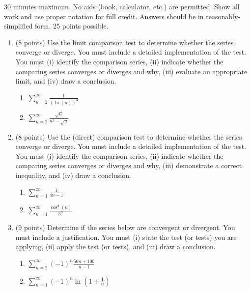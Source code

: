 \documentclass[12pt]{article}
\newcommand{\ds}{\displaystyle}
\begin{document}
30 minutes maximum.  No aids (book, calculator, etc.) are permitted.  Show all work and use proper notation for full credit.  Answers should be in reasonably-simplified form.  25 points possible.

\begin{enumerate}
\item (8 points) Use the limit comparison test to determine whether the series converge or diverge. You must include a detailed implementation of the test. You must (i) identify the comparison series, (ii) indicate whether the comparing series converges or diverges and why, (iii) evaluate an appropriate limit, and (iv) draw a conclusion.
	\begin{enumerate}
	\item $\ds \sum_{n=2}^{\infty} \frac{1}{(\ln(n))^3}$
	\vfill
	\item $\ds \sum_{n=2}^{\infty} \frac{\sqrt{n}}{n^2-\sqrt{n}}$
	\vfill
	\end{enumerate}
\newpage
\item (8 points) Use the (direct) comparison test to determine whether the series converge or diverge. You must include a detailed implementation of the test. You must (i) identify the comparison series, (ii) indicate whether the comparing series converges or diverges and why, (iii) demonstrate a correct inequality, and (iv) draw a conclusion.
	\begin{enumerate}
	\item $\ds \sum_{n=1}^{\infty} \frac{1}{4n-1}$
	\vfill
	\item $\ds \sum_{n=1}^{\infty} \frac{\cos^2(n)}{3^n}$
	\vfill
	\end{enumerate}
\newpage

\item (9 points) Determine if the series below are convergent or divergent. You must include a justification. You must (i) state the test (or tests) you are applying, (ii) apply the test (or tests), and (iii) draw a conclusion.
	\begin{enumerate}
	\item $\ds \sum_{n=2}^{\infty} (-1)^{n}\frac{50n+100}{n-1} $
	\vfill
	\item $\ds \sum_{n=1}^{\infty} (-1)^n \ln(1+\frac{1}{n})$ 
	\vfill
	
	\end{enumerate}
\end{enumerate}
\end{document}
